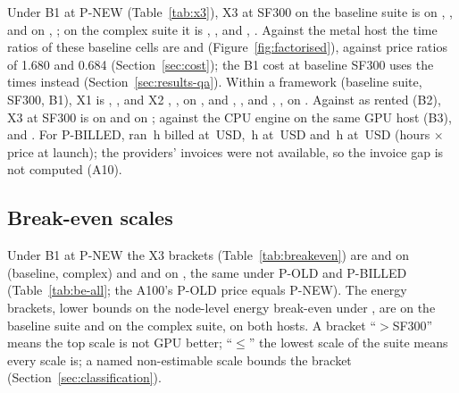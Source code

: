 \documentclass[sigconf]{acmart}
\begin{document}
Under B1 at P-NEW (Table~\ref{tab:x3}), X3 at SF300 on the baseline suite is
 on \GH, , and
 on \GA, ; on the complex
suite it is , , and
, . Against the metal host the time ratios of these baseline cells are
 and  (Figure~\ref{fig:factorised}),
against price ratios of 1.680 and 0.684 (Section~\ref{sec:cost}); the B1 cost at baseline SF300 uses the
\CV{} times instead (Section~\ref{sec:results-qa}). Within a framework (baseline
suite, SF300, B1), X1 is , ,
and X2 , , on \GH, and
, , and
, , on \GA. Against \CG{} as
rented (B2), X3 at SF300 is  on \GH{} and
 on \GA; against the CPU engine on the same GPU host (B3),
 and . For P-BILLED, \GH{}
ran \,h billed at \,USD, \GA{}
\,h at \,USD and \CG{}
\,h at \,USD (hours $\times$ price at
launch); the providers' invoices were not available, so the invoice gap is not computed (A10).

\subsection{Break-even scales}
\label{sec:results-breakeven}

Under B1 at P-NEW the X3 brackets (Table~\ref{tab:breakeven}) are
 and  on
\GH{} (baseline, complex) and  and
 on \GA, the same under P-OLD and P-BILLED
(Table~\ref{tab:be-all}; the A100's P-OLD price equals P-NEW). The energy brackets, lower bounds on the
node-level energy break-even under \NOne, are  on the
baseline suite and  on the complex suite, on both hosts. A bracket ``$>$SF300'' means the top scale is not GPU better; ``$\le$'' the lowest scale of the suite
means every scale is; a named non-estimable scale bounds the bracket (Section~\ref{sec:classification}).
\end{document}
